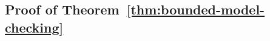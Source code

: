 %
%
%


\subsection{Proof of Theorem~\ref{thm:bounded-model-checking}}\label{proofbmc}


\thmBoundedMC*

